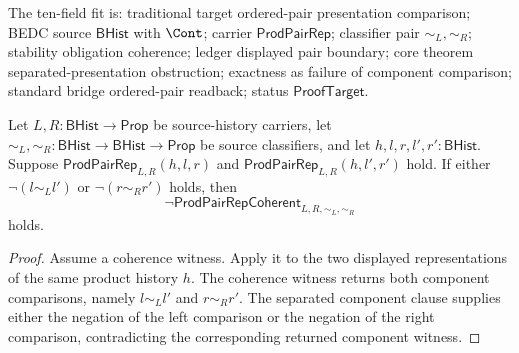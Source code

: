 \begin{theorem}
\label{thm:prod-pair-rep-coherence-obstruction-separated-presentations}
The ten-field fit is: traditional target ordered-pair presentation comparison;
BEDC source $\mathsf{BHist}$ with $\Cont$; carrier $\mathsf{ProdPairRep}$;
classifier pair $\sim_L,\sim_R$; stability obligation coherence; ledger
displayed pair boundary; core theorem separated-presentation obstruction;
exactness as failure of component comparison; standard bridge ordered-pair
readback; status $\mathsf{ProofTarget}$.

Let $L,R:\mathsf{BHist}\to\mathsf{Prop}$ be source-history carriers, let
$\sim_L,\sim_R:\mathsf{BHist}\to\mathsf{BHist}\to\mathsf{Prop}$ be source
classifiers, and let $h,l,r,l',r':\mathsf{BHist}$. Suppose
$\mathsf{ProdPairRep}_{L,R}(h,l,r)$ and
$\mathsf{ProdPairRep}_{L,R}(h,l',r')$ hold. If either
$\neg(l\sim_L l')$ or $\neg(r\sim_R r')$ holds, then
$$
\neg\mathsf{ProdPairRepCoherent}_{L,R,\sim_L,\sim_R}
$$
holds.
\end{theorem}
\begin{proof}
Assume a coherence witness. Apply it to the two displayed representations of
the same product history $h$. The coherence witness returns both component
comparisons, namely $l\sim_L l'$ and $r\sim_R r'$. The separated component
clause supplies either the negation of the left comparison or the negation of
the right comparison, contradicting the corresponding returned component
witness.
\end{proof}

